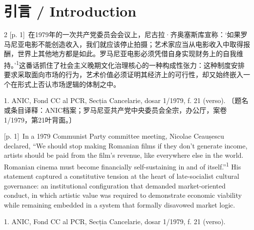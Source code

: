 \documentclass[10pt,a4paper]{article}
\begin{document}
\section*{引言 / Introduction}
\begin{paracol}{2}
{\scriptsize\color{gray} [p. 1]}\ 在1979年的一次共产党委员会会议上，尼古拉·齐奥塞斯库宣称：‘如果罗马尼亚电影不能创造收入，我们就应该停止拍摄；艺术家应当从电影收入中取得报酬，世界上其他地方都是如此。罗马尼亚电影必须凭借自身实现财务上的自我维持。’\nobreak\textsuperscript{1}这番话抓住了社会主义晚期文化治理核心的一种构成性张力：这种制度安排要求采取面向市场的行为，艺术价值必须证明其经济上的可行性，却又始终嵌入一个在形式上否认市场逻辑的体制之中。\par{\small 1. ANIC, Fond CC al PCR, Secția Cancelarie, dosar 1/1979, f. 21 (verso). 〔题名或条目译释：ANIC档案；罗马尼亚共产党中央委员会全宗，办公厅，案卷1/1979，第21叶背面。〕\par}
\switchcolumn
{\scriptsize\color{gray} [p. 1]}\ In a 1979 Communist Party committee meeting, Nicolae Ceaușescu declared, “We should stop making Romanian films if they don’t generate income, artists should be paid from the film’s revenue, like everywhere else in the world. Romanian cinema must become financially self-sustaining in and of itself.”\nobreak\textsuperscript{1} His statement captured a constitutive tension at the heart of late-socialist cultural governance: an institutional configuration that demanded market-oriented conduct, in which artistic value was required to demonstrate economic viability while remaining embedded in a system that formally disavowed market logic.\par{\small 1. ANIC, Fond CC al PCR, Secția Cancelarie, dosar 1/1979, f. 21 (verso).\par}
\switchcolumn*

\end{paracol}
\end{document}

